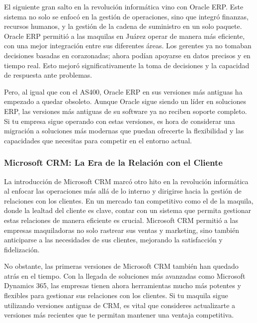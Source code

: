 \documentclass[
  10pt,
  letterpaper,
]{book}
\begin{document}
El siguiente gran salto en la revolución informática vino con Oracle
ERP. Este sistema no solo se enfocó en la gestión de operaciones, sino
que integró finanzas, recursos humanos, y la gestión de la cadena de
suministro en un solo paquete. Oracle ERP permitió a las maquilas en
Juárez operar de manera más eficiente, con una mejor integración entre
sus diferentes áreas. Los gerentes ya no tomaban decisiones basadas en
corazonadas; ahora podían apoyarse en datos precisos y en tiempo real.
Esto mejoró significativamente la toma de decisiones y la capacidad de
respuesta ante problemas.

Pero, al igual que con el AS400, Oracle ERP en sus versiones más
antiguas ha empezado a quedar obsoleto. Aunque Oracle sigue siendo un
líder en soluciones ERP, las versiones más antiguas de su software ya no
reciben soporte completo. Si tu empresa sigue operando con estas
versiones, es hora de considerar una migración a soluciones más modernas
que puedan ofrecerte la flexibilidad y las capacidades que necesitas
para competir en el entorno actual.

\subsubsection{Microsoft CRM: La Era de la Relación con el
Cliente}\label{microsoft-crm-la-era-de-la-relaciuxf3n-con-el-cliente}

La introducción de Microsoft CRM marcó otro hito en la revolución
informática al enfocar las operaciones más allá de lo interno y
dirigirse hacia la gestión de relaciones con los clientes. En un mercado
tan competitivo como el de la maquila, donde la lealtad del cliente es
clave, contar con un sistema que permita gestionar estas relaciones de
manera eficiente es crucial. Microsoft CRM permitió a las empresas
maquiladoras no solo rastrear sus ventas y marketing, sino también
anticiparse a las necesidades de sus clientes, mejorando la satisfacción
y fidelización.

No obstante, las primeras versiones de Microsoft CRM también han quedado
atrás en el tiempo. Con la llegada de soluciones más avanzadas como
Microsoft Dynamics 365, las empresas tienen ahora herramientas mucho más
potentes y flexibles para gestionar sus relaciones con los clientes. Si
tu maquila sigue utilizando versiones antiguas de CRM, es vital que
consideres actualizarte a versiones más recientes que te permitan
mantener una ventaja competitiva.
\end{document}

